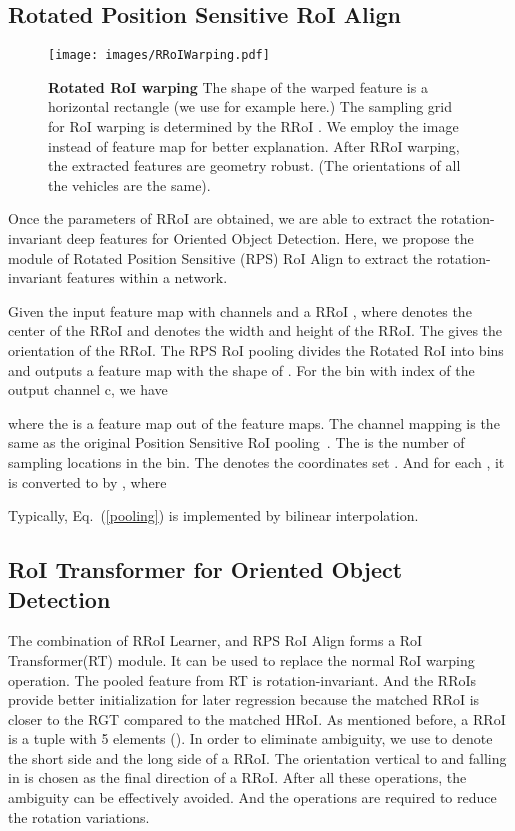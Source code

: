 \documentclass[11pt,onecolumn]{article}         \usepackage[top=3.6cm, bottom=3.2cm, left=2.3cm, right=2.3cm]{geometry}
\begin{document}
\subsection{Rotated Position Sensitive RoI Align}
\begin{figure}[t!]
    \centering
    \texttt{[image: images/RRoIWarping.pdf]}
\caption{{\bf Rotated RoI warping} The shape of the warped feature is a horizontal rectangle (we use  for example here.) The sampling grid for RoI warping is determined by the RRoI . We employ the image instead of feature map for better explanation. After RRoI warping, the extracted features are geometry robust. (The orientations of all the vehicles are the same).
    }
\label{fig:R-RoI-warping}
\end{figure}
Once the parameters of RRoI are obtained, we are able to extract the rotation-invariant deep features for Oriented Object Detection.
Here, we propose the module of Rotated Position Sensitive (RPS) RoI Align to extract the rotation-invariant features within a network.

Given the input feature map  with  channels and a RRoI , where  denotes the center of the RRoI and  denotes the width and height of the RRoI. The  gives the orientation of the RRoI.
The RPS RoI pooling divides the Rotated RoI into  bins and outputs a feature map  with the shape of . 
For the  bin with index   of the output channel c, we have

where the  is a feature map out of the  feature maps. The channel mapping is the same as the original Position Sensitive RoI pooling~\cite{R-FCN}. The  is the number of sampling locations in the bin. The 
denotes the coordinates set .
 And for each , it is converted to   by , where

Typically, Eq.~(\ref{pooling}) is implemented by bilinear interpolation.
\subsection{RoI Transformer for Oriented Object Detection}
The combination of RRoI Learner, and RPS RoI Align forms a RoI Transformer(RT) module. It can be used to replace the normal RoI warping operation.
The pooled feature from RT is rotation-invariant. And the RRoIs provide better initialization for later regression because the matched RRoI is closer to the RGT compared to the matched HRoI.
As mentioned before, a RRoI is a tuple with 5 elements (). 
In order to eliminate ambiguity, we use  to denote the short side and  the long side of a RRoI. The orientation vertical to   and falling in  is chosen as the final direction of a RRoI. After all these operations, the ambiguity can be effectively avoided. And the operations are required to reduce the rotation variations. 
\end{document}
